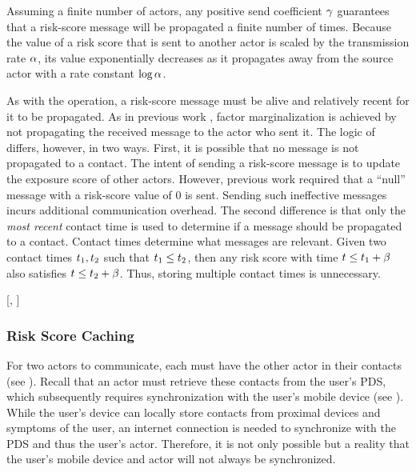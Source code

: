 Assuming a finite number of actors, any positive send coefficient $\gamma$ guarantees that a risk-score message will be propagated a finite number of times. Because the value of a risk score that is sent to another actor is scaled by the transmission rate $\alpha$, its value exponentially decreases as it propagates away from the source actor with a rate constant $\log \alpha$.

As with the \cSendCurrentOrCached[] operation, a risk-score message must be alive and relatively recent for it to be propagated. As in previous work \cite{Ayday2021}, factor marginalization is achieved by not propagating the received message to the actor who sent it. The logic of \cPropagate[] differs, however, in two ways. First, it is possible that no message is not propagated to a contact. The intent of sending a risk-score message is to update the exposure score of other actors. However, previous work \cite{Ayday2021} required that a ``null'' message with a risk-score value of 0 is sent. Sending such ineffective messages incurs additional communication overhead. The second difference is that only the \emph{most recent} contact time is used to determine if a message should be propagated to a contact. Contact times determine what messages are relevant. Given two contact times $t_1, t_2$ such that $t_1 \leq t_2$, then any risk score with time $t \leq t_1 + \beta$ also satisfies $t \leq t_2 + \beta$. Thus, storing multiple contact times is unnecessary.
%
\begin{function}{\nPropagate}[\vActor, \vScore]
\mForEach{\vContact \in \aActorContacts}
	\mIf{\cShouldReceive[\vContact, \vScore]}
		\mState{\cSend[\vActor, \vContact, \vScore]}
	\EndIf
\EndFor
\end{function}

\subsubsection{Risk Score Caching}\label{sec:caching}

For two actors to communicate, each must have the other actor in their contacts (see ). Recall that an actor must retrieve these contacts from the user's PDS, which subsequently requires synchronization with the user's mobile device (see ). While the user's device can locally store contacts from proximal devices and symptoms of the user, an internet connection is needed to synchronize with the PDS and thus the user's actor. Therefore, it is not only possible but a reality that the user's mobile device and actor will not always be synchronized.

